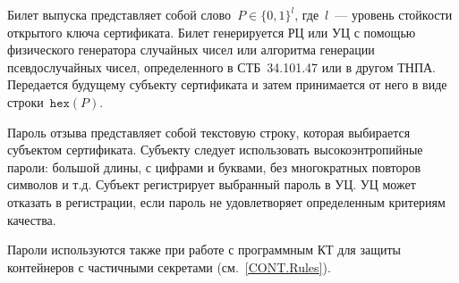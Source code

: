 Билет выпуска представляет собой слово~$P\in\{0,1\}^l$,
где~$l$~--- уровень стойкости открытого ключа сертификата.
%
Билет генерируется РЦ или УЦ с помощью физического генератора 
случайных чисел или алгоритма генерации псевдослучайных чисел, 
определенного в СТБ~34.101.47 или в другом ТНПА. 
%
Передается будущему субъекту сертификата и затем принимается от него
в виде строки~$\texttt{hex}(P)$. 

Пароль отзыва представляет собой текстовую строку, которая выбирается 
субъектом сертификата. Субъекту следует использовать  
высокоэнтропийные пароли: большой длины, с цифрами и буквами, 
без многократных повторов символов и т.д.
%
Субъект регистрирует выбранный пароль в УЦ. УЦ может отказать в регистрации, 
если пароль не удовлетворяет определенным критериям качества. 

Пароли используются также при работе с программным КТ для защиты 
контейнеров с частичными секретами (см.~\ref{CONT.Rules}).

